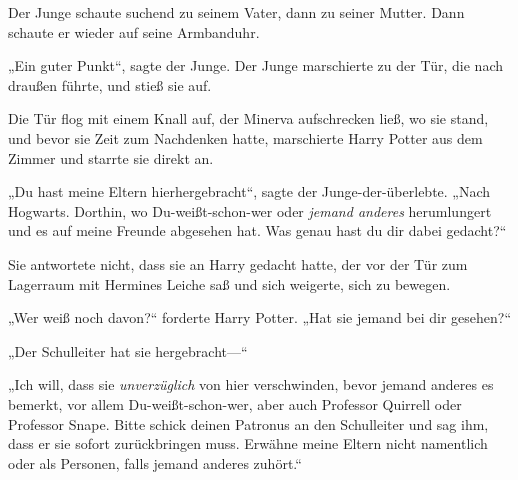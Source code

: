 Der Junge schaute suchend zu seinem Vater, dann zu seiner Mutter. Dann schaute er wieder auf seine Armbanduhr.


„Ein guter Punkt“, sagte der Junge. Der Junge marschierte zu der Tür, die nach draußen führte, und stieß sie auf.

\later

Die Tür flog mit einem Knall auf, der Minerva aufschrecken ließ, wo sie stand, und bevor sie Zeit zum Nachdenken hatte, marschierte Harry Potter aus dem Zimmer und starrte sie direkt an.

„Du hast meine Eltern hierhergebracht“, sagte der Junge-der-überlebte.
„Nach Hogwarts. Dorthin, wo Du-weißt-schon-wer oder \emph{jemand anderes} herumlungert und es auf meine Freunde abgesehen hat. Was genau hast du dir dabei gedacht?“

Sie antwortete nicht, dass sie an Harry gedacht hatte, der vor der Tür zum Lagerraum mit Hermines Leiche saß und sich weigerte, sich zu bewegen.

„Wer weiß noch davon?“ forderte Harry Potter. „Hat sie jemand bei dir gesehen?“

„Der Schulleiter hat sie hergebracht—“

„Ich will, dass sie \emph{unverzüglich} von hier verschwinden, bevor jemand anderes es bemerkt, vor allem Du-weißt-schon-wer, aber auch Professor Quirrell oder Professor Snape. Bitte schick deinen Patronus an den Schulleiter und sag ihm, dass er sie sofort zurückbringen muss. Erwähne meine Eltern nicht namentlich oder als Personen, falls jemand anderes zuhört.“

